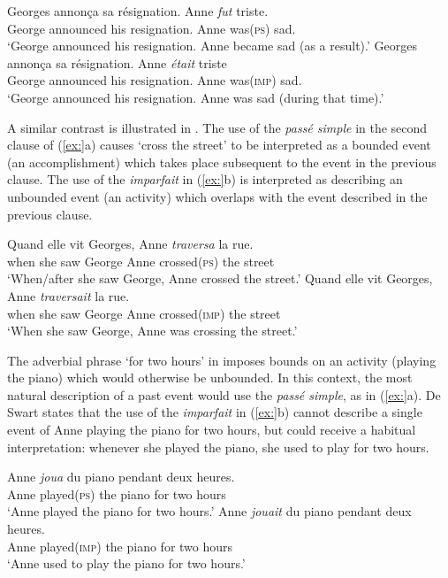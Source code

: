 \ea
\ea  \gll Georges  annonça  sa  résignation.  Anne  \textit{fut}  triste.\\
George  announced  his  resignation.  Anne  was(\textsc{ps})  sad.\\
\glt ‘George announced his resignation. Anne became sad (as a result).’
\ex \gll  Georges  annonça  sa  résignation.  Anne  \textit{était}  triste\\
George  announced  his  resignation.  Anne  was(\textsc{imp})  sad.\\
\glt ‘George announced his resignation. Anne was sad (during that time).’
\z \z


A similar contrast is illustrated in . The use of the \textit{passé simple} in the second clause of (\ref{ex:}a) causes ‘cross the street’ to be interpreted as a bounded event (an accomplishment) which takes place subsequent to the event in the previous clause. The use of the \textit{imparfait} in (\ref{ex:}b) is interpreted as describing an unbounded event (an activity) which overlaps with the event described in the previous clause.


\ea
\ea \gll Quand  elle  vit  Georges,  Anne  \textit{traversa}  la  rue.\\
when  she  saw  George  Anne  crossed(\textsc{ps})  the  street\\
\glt ‘When/after she saw George, Anne crossed the street.’
\ex \gll  Quand  elle  vit  Georges,  Anne  \textit{traversait}  la  rue.\\
when  she  saw  George  Anne  crossed(\textsc{imp})  the  street\\
\glt ‘When she saw George, Anne was crossing the street.’
\z \z


The adverbial phrase ‘for two hours’ in  imposes bounds on an activity (playing the piano) which would otherwise be unbounded. In this context, the most natural description of a past event would use the \textit{passé simple}, as in (\ref{ex:}a). De Swart states that the use of the \textit{imparfait} in (\ref{ex:}b) cannot describe a single event of Anne playing the piano for two hours, but could receive a habitual interpretation: whenever she played the piano, she used to play for two hours.


\ea
\ea \gll  Anne  \textit{joua}  du  piano  pendant  deux  heures.\\
Anne  played(\textsc{ps})  the  piano  for  two  hours\\
\glt ‘Anne played the piano for two hours.’
\ex \gll  Anne  \textit{jouait}  du  piano  pendant  deux  heures.\\
Anne  played(\textsc{imp})  the  piano  for  two  hours\\
\glt ‘Anne used to play the piano for two hours.’
\z \z



